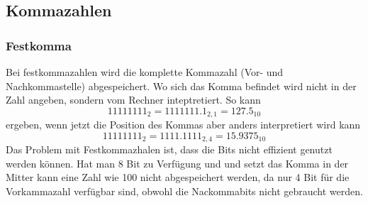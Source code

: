 \documentclass[a4paper]{scrartcl}
\begin{document}
        \subsection{Kommazahlen}
        \subsubsection{Festkomma}
            Bei festkommazahlen wird die komplette Kommazahl (Vor- und Nachkommastelle) abgespeichert. Wo sich das Komma befindet wird nicht in der Zahl angeben, sondern vom Rechner 
            inteptretiert. So kann
            \begin{equation}
                11111111_2 = 1111111.1_{2,1}  = 127.5_{10}
            \end{equation}
            ergeben, wenn jetzt die Position des Kommas aber anders interpretiert wird kann
            \begin{equation}
                11111111_2 = 1111.1111_{2,4} = 15.9375_{10}        
            \end{equation}
            Das Problem mit Festkommazhalen ist, dass die Bits nicht effizient genutzt werden können. Hat man 8 Bit zu Verfügung und und setzt das Komma in der Mitter kann eine 
            Zahl wie 100 nicht abgespeichert werden, da nur 4 Bit für die Vorkammazahl verfügbar sind, obwohl die Nackommabits nicht gebraucht werden.
\end{document}
